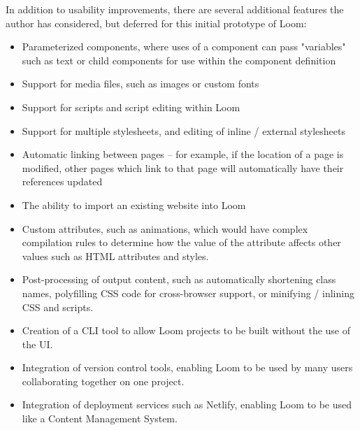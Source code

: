 \documentclass[conference, letterpaper]{IEEEtran}
\begin{document}
In addition to usability improvements, there are several additional features the author has considered, but deferred for this initial prototype of Loom:
\begin{itemize}
  \item Parameterized components, where uses of a component can pass "variables" such as text or child components for use within the component definition
  \item Support for media files, such as images or custom fonts
  \item Support for scripts and script editing within Loom
  \item Support for multiple stylesheets, and editing of inline / external stylesheets
  \item Automatic linking between pages -- for example, if the location of a page is modified, other pages which link to that page will automatically have their references updated
  \item The ability to import an existing website into Loom
  \item Custom attributes, such as animations, which would have complex compilation rules to determine how the value of the attribute affects other values such as HTML attributes and styles.
  \item Post-processing of output content, such as automatically shortening class names, polyfilling CSS code for cross-browser support, or minifying / inlining CSS and scripts.
  \item Creation of a CLI tool to allow Loom projects to be built without the use of the UI.
  \item Integration of version control tools, enabling Loom to be used by many users collaborating together on one project.
  \item Integration of deployment services such as Netlify\cite{Netlify}, enabling Loom to be used like a Content Management System.
\end{itemize}

\pagebreak








\end{document}
